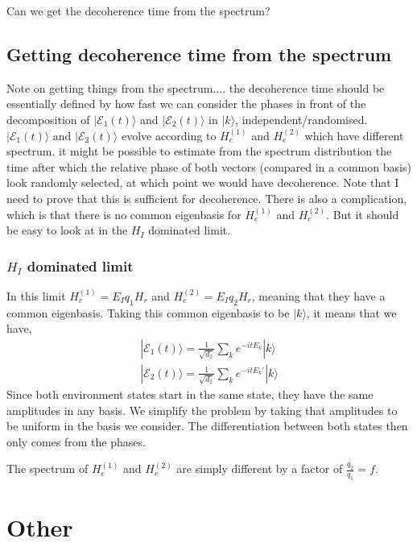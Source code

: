 \documentclass{article}
\begin{document}

Can we get the decoherence time from the spectrum?

\subsection{Getting decoherence time from the spectrum}

Note on getting things from the spectrum.... the decoherence time should be essentially defined by how fast we can consider the phases in front of the decomposition of $|\mathcal{E}_1(t)\rangle$ and $|\mathcal{E}_2(t)\rangle$ in $|k\rangle$, independent/randomised. $|\mathcal{E}_1(t)\rangle$ and $|\mathcal{E}_2(t)\rangle$ evolve according to $H_e^{(1)}$ and $H_e^{(2)}$ which have different spectrum. it might be possible to estimate from the spectrum distribution the time after which the relative phase of both vectors (compared in a common basis) look randomly selected, at which point we would have decoherence. Note that I need to prove that this is sufficient for decoherence. There is also a complication, which is that there is no common eigenbasis for $H_e^{(1)}$ and $H_e^{(2)}$. But it should be easy to look at in the $H_I$ dominated limit.

\subsubsection{$H_I$ dominated limit}
In this limit $H_e^{(1)}=E_Iq_1H_r$ and $H_e^{(2)}=E_Iq_2H_r$, meaning that they have a common eigenbasis. Taking this common eigenbasis to be $|k\rangle$, it means that we have,
\begin{align}
    |\mathcal{E}_1(t)\rangle=\frac{1}{\sqrt{d_2}}\sum_ke^{-itE_k}|k\rangle\\
    |\mathcal{E}_2(t)\rangle=\frac{1}{\sqrt{d_2}}\sum_ke^{-itE_k'}|k\rangle
\end{align}
Since both environment states start in the same state, they have the same amplitudes in any basis. We simplify the problem by taking that amplitudes to be uniform in the basis we consider. The differentiation between both states then only comes from the phases. 

The spectrum of $H_e^{(1)}$ and $H_e^{(2)}$ are simply different by a factor of $\frac{q_2}{q_1}=f$.





\section{Other}
\end{document}
